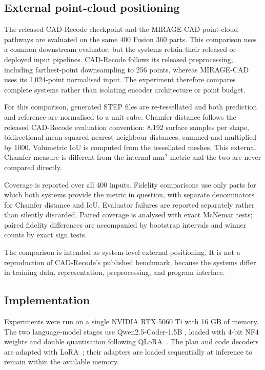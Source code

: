 \documentclass[preprint,12pt]{elsarticle}
\begin{document}
\subsection{External point-cloud positioning}
\label{sec:external_protocol}

The released CAD-Recode checkpoint
\cite{rukhovich2025cadrecode} and the MIRAGE-CAD point-cloud pathways are
evaluated on the same 400 Fusion 360 parts. This comparison uses a common
downstream evaluator, but the systems retain their released or deployed input
pipelines. CAD-Recode follows its released preprocessing, including
farthest-point downsampling to 256 points, whereas MIRAGE-CAD uses its
1,024-point normalised input. The experiment therefore compares complete
systems rather than isolating encoder architecture or point budget.

For this comparison, generated STEP files are re-tessellated and both
prediction and reference are normalised to a unit cube. Chamfer distance
follows the released CAD-Recode evaluation convention: 8,192 surface samples
per shape, bidirectional mean squared nearest-neighbour distances, summed and
multiplied by 1000. Volumetric IoU is computed from the tessellated meshes.
This external Chamfer measure is different from the internal mm$^2$ metric and
the two are never compared directly.

Coverage is reported over all 400 inputs. Fidelity comparisons use only parts
for which both systems provide the metric in question, with separate
denominators for Chamfer distance and IoU. Evaluator failures are reported
separately rather than silently discarded. Paired coverage is analysed with
exact McNemar tests; paired fidelity differences are accompanied by bootstrap
intervals and winner counts by exact sign tests.

The comparison is intended as system-level external positioning. It is not a
reproduction of CAD-Recode's published benchmark, because the systems differ
in training data, representation, preprocessing, and program interface.


\subsection{Implementation}
\label{sec:implementation}

Experiments were run on a single NVIDIA RTX 5060 Ti with 16 GB of memory.
The two language-model stages use Qwen2.5-Coder-1.5B
\cite{yang2025qwen25}, loaded with 4-bit NF4 weights and double quantisation
following QLoRA~\cite{dettmers2023qlora}. The plan and code decoders are
adapted with LoRA~\cite{hu2021lora}; their adapters are loaded sequentially at
inference to remain within the available memory.
\end{document}
